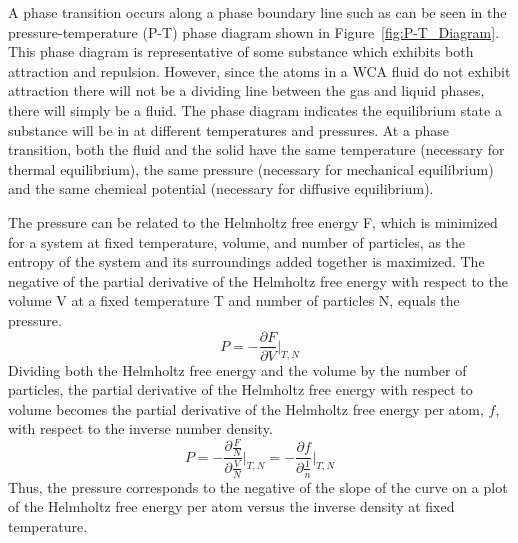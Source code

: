 \documentclass[double,12pt]{beavtex}
\begin{document}
A phase transition occurs along a phase boundary line %
such as can be seen in the pressure-temperature (P-T) phase diagram
shown in Figure~\ref{fig:P-T_Diagram}. 
%
%
This phase diagram is 
representative of some substance 
which exhibits both attraction and repulsion. However, since 
the atoms in a WCA fluid do not exhibit attraction there will not be a 
dividing line between the gas and liquid phases, there will simply
be a fluid.
The phase diagram indicates the equilibrium state a substance will be in at
different temperatures and pressures.
At a phase transition, both the fluid and the solid have 
the same temperature (necessary 
for thermal equilibrium), the same pressure (necessary for mechanical 
equilibrium) and the same chemical potential (necessary for diffusive equilibrium).

The pressure can be related to the Helmholtz free energy F, which is minimized 
for a system at fixed temperature, volume, and number of particles, as the 
entropy of the system and its surroundings added together is maximized. The negative of 
the partial derivative of the Helmholtz free energy with respect to the volume V 
at a fixed temperature T and number of particles N, equals the pressure. 
\begin{equation}{P=-\frac{\partial{F}}{\partial{V}}\bigg|_{T,N}}\end{equation}
\noindent Dividing both the Helmholtz free energy and the volume by the 
number of particles, the partial derivative of the Helmholtz free energy 
with respect to volume becomes the partial derivative of the Helmholtz 
free energy per atom, $f$,  with respect to the inverse number density. 
\begin{equation}{P=-\frac{\partial{\frac{F}{N}}}{\partial{\frac{V}{N}}}\bigg|_{T,N} = -\frac{\partial{f}}{\partial{\frac{1}{n}}}\bigg|_{T,N}}\end{equation} 
Thus, the pressure corresponds to the negative of the slope of the curve 
on a plot of the Helmholtz free energy per atom versus the inverse 
density at fixed temperature. 
 
\end{document}
